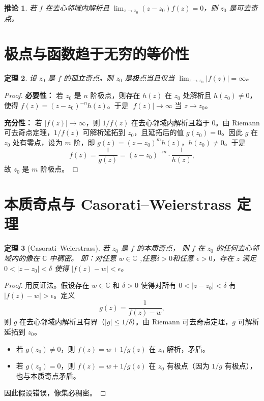 \documentclass[UTF8]{ctexart}
\newtheorem{theorem}{定理}[section]
\newtheorem{corollary}[theorem]{推论}
\numberwithin{equation}{section}
\newcommand{\CC}{\mathbb{C}}
\begin{document}
\begin{corollary}
若 \(f\) 在去心邻域内解析且 \(\lim_{z\to z_0}(z-z_0)f(z)=0\)，则 \(z_0\) 是可去奇点。
\end{corollary}

\section{极点与函数趋于无穷的等价性}
\begin{theorem}\label{thm:pole}
设 \(z_0\) 是 \(f\) 的孤立奇点。则 \(z_0\) 是极点当且仅当 \(\lim_{z\to z_0}|f(z)| = \infty\)。
\end{theorem}

\begin{proof}
\textbf{必要性：} 若 \(z_0\) 是 \(n\) 阶极点，则存在 \(h(z)\) 在 \(z_0\) 处解析且 \(h(z_0)\neq0\)，使得 \(f(z)=(z-z_0)^{-n}h(z)\)。于是 \(|f(z)|\to\infty\) 当 \(z\to z_0\)。

\textbf{充分性：} 若 \(|f(z)|\to\infty\)，则 \(1/f(z)\) 在去心邻域内解析且趋于 \(0\)。由 Riemann 可去奇点定理，\(1/f(z)\) 可解析延拓到 \(z_0\)，且延拓后的值 \(g(z_0)=0\)。因此 \(g\) 在 \(z_0\) 处有零点，设为 \(m\) 阶，即 \(g(z)=(z-z_0)^m h(z)\)，\(h(z_0)\neq0\)。于是
\[
f(z) = \frac{1}{g(z)} = (z-z_0)^{-m} \cdot \frac{1}{h(z)},
\]
故 \(z_0\) 是 \(m\) 阶极点。
\end{proof}

\section{本质奇点与 Casorati–Weierstrass 定理}
\begin{theorem}[Casorati–Weierstrass]
若 \(z_0\) 是 \(f\) 的本质奇点，
则 \(f\) 在 \(z_0\) 的任何去心邻域内的像在 \(\CC\) 中稠密。
即：对任意 \(w\in\CC\) ,任意\(\delta>0\)和任意 \(\epsilon>0\)，存在 \(z\) 满足 \(0<|z-z_0|<\delta\) 使得 \(|f(z)-w|<\epsilon\)。
\end{theorem}

\begin{proof}
用反证法。假设存在 \(w\in\CC\) 和 \(\delta>0\) 使得对所有 \(0<|z-z_0|<\delta\) 有 \(|f(z)-w|>\epsilon\)。定义
\[
g(z) = \frac{1}{f(z)-w},
\]
则 \(g\) 在去心邻域内解析且有界（\(|g|\le 1/\delta\)）。由 Riemann 可去奇点定理，\(g\) 可解析延拓到 \(z_0\)。
\begin{itemize}
\item 若 \(g(z_0)\neq0\)，则 \(f(z)=w+1/g(z)\) 在 \(z_0\) 解析，矛盾。
\item 若 \(g(z_0)=0\)，则 \(f(z)=w+1/g(z)\) 在 \(z_0\) 有极点（因为 \(1/g\) 有极点），也与本质奇点矛盾。
\end{itemize}
因此假设错误，像集必稠密。
\end{proof}
\end{document}
